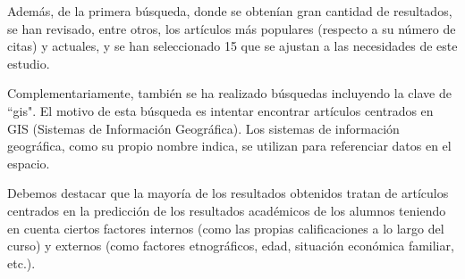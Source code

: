 Además, de la primera búsqueda, donde se obtenían gran cantidad de resultados, se han revisado, entre otros, los artículos más populares (respecto a su número de citas) y actuales, y se han seleccionado 15 que se ajustan a las necesidades de este estudio.

Complementariamente, también se ha realizado búsquedas incluyendo la clave de ``gis". El motivo de esta búsqueda es intentar encontrar artículos centrados en GIS (Sistemas de Información Geográfica). Los sistemas de información geográfica, como su propio nombre indica, se utilizan para referenciar datos en el espacio. 



Debemos destacar que la mayoría de los resultados obtenidos tratan de artículos centrados en la predicción de los resultados académicos de los alumnos teniendo en cuenta ciertos factores internos (como las propias calificaciones a lo largo del curso) y externos (como factores etnográficos, edad, situación económica familiar, etc.).



